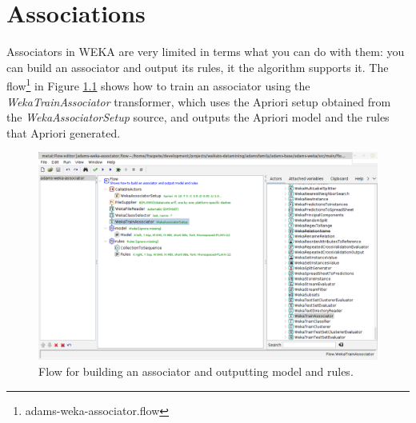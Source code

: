 
\chapter{Associations}
\label{associations}

Associators in WEKA are very limited in terms what you can do with them: you
can build an associator and output its rules, it the algorithm supports it.
The flow\footnote{adams-weka-associator.flow} in Figure \ref{associator}
shows how to train an associator using the \textit{WekaTrainAssociator}
transformer, which uses the Apriori setup obtained from the \textit{WekaAssociatorSetup}
source, and outputs the Apriori model and the rules that Apriori generated.

\begin{figure}[htb]
  \centering
  \includegraphics[width=12.0cm]{images/associator.png}
  \caption{Flow for building an associator and outputting model and rules.}
  \label{associator}
\end{figure}
